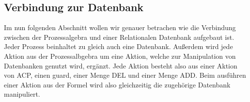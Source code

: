 \subsection{Verbindung zur Datenbank}
Im nun folgenden Abschnitt wollen wir genauer betrachen wie die Verbindung zwischen der Prozessalgebra und einer Relationalen Datenbank aufgebaut ist.\\
Jeder Prozess beinhaltet zu gleich auch eine Datenbank. Außerdem wird jede Aktion aus der Prozessalbgebra um eine Aktion, welche zur Manipulation von Datenbanken genutzt wird, ergänzt. Jede Aktion besteht also aus einer Aktion von ACP, einen guard, einer Menge DEL und einer Menge ADD. Beim ausführen einer Aktion aus der Formel wird also gleichzeitig die zugehörige Datenbank manipuliert.  







